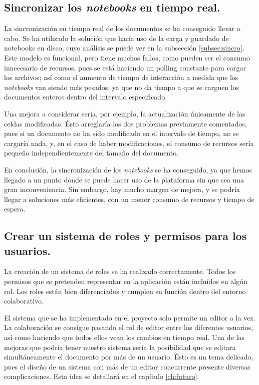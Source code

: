 \documentclass[11pt,spanish,listoffigures,listoftables]{tfgetsinf}
\begin{document}
\subsection{Sincronizar los \textit{notebooks} en tiempo real.}
\label{subsec:objetivos-conc-sincro}

La sincronización en tiempo real de los documentos se ha conseguido llevar a cabo. Se ha utilizado la solución que hacía uso de la carga y guardado de notebooks en disco, cuyo análisis se puede ver en la subsección \ref{subsec:sincro}. Este modelo es funcional, pero tiene muchos fallos, como pueden ser el consumo innecesario de recursos, pues se está haciendo un polling constante para cargar los archivos; así como el aumento de tiempo de interacción a medida que los \textit{notebooks} van siendo más pesados, ya que no da tiempo a que se carguen los documentos enteros dentro del intervalo especificado.

Una mejora a considerar sería, por ejemplo, la actualización únicamente de las celdas modificadas. Ésto arreglaría los dos problemas previamente comentados, pues si un documento no ha sido modificado en el intervalo de tiempo, no se cargaría nada, y, en el caso de haber modificaciones, el consumo de recursos sería pequeño independientemente del tamaño del documento. 

En conclusión, la sincronización de los \textit{notebooks} se ha conseguido, ya que hemos llegado a un punto donde se puede hacer uso de la plataforma sin que sea una gran inconveniencia. Sin embargo, hay mucho margen de mejora, y se podría llegar a soluciones más eficientes, con un menor consumo de recursos y tiempo de espera.

\subsection{Crear un sistema de roles y permisos para los usuarios.}
\label{subsec:objetivos-conc-roles}

La creación de un sistema de roles se ha realizado correctamente. Todos los permisos que se pretenden representar en la aplicación están incluídos en algún rol. Los roles están bien diferenciados y cumplen su función dentro del entorno colaborativo. 

El sistema que se ha implementado en el proyecto solo permite un editor a la vez. La colaboración se consigue pasando el rol de editor entre los diferentes usuarios, así como haciendo que todos ellos vean los cambios en tiempo real. Una de las mejoras que podría tener nuestro sistema sería la posibilidad que se editara simultáneamente el documento por más de un usuario. Ésto es un tema delicado, pues el diseño de un sistema con más de un editor concurrente presente diversas complicaciones. Esta idea se detallará en el capítulo \ref{ch:futuro}.
\end{document}
